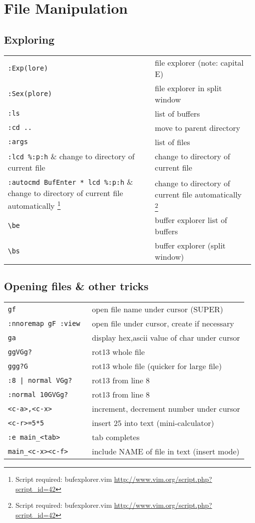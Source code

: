 \section{File Manipulation}

\subsection{Exploring}
\begin{center}
\begin{longtable}{l|l}
 \verb!:Exp(lore)! & file explorer (note: capital E)\\
 \verb!:Sex(plore)! & file explorer in split window\\
 \verb!:ls! & list of buffers\\
 \verb!:cd ..! & move to parent directory\\
 \verb!:args! & list of files\\
 \verb!:lcd %:p:h! & change to directory of current file\\
 \verb!:autocmd BufEnter * lcd %:p:h! & change to directory of current file automatically \footnote{Script required: bufexplorer.vim \url{http://www.vim.org/script.php?script\_id=42}}\\
 \verb!\be! & buffer explorer list of buffers\\
 \verb!\bs! & buffer explorer (split window)
\end{longtable}
\end{center}

\subsection{Opening files \& other tricks}
\begin{center}
\begin{longtable}{l|l}
 \verb!gf! & open file name under cursor (SUPER)\\
 \verb!:nnoremap gF :view ! & open file under cursor, create if necessary\\
 \verb!ga! & display hex,ascii value of char under cursor\\
 \verb!ggVGg?! & rot13 whole file\\
 \verb!ggg?G! & rot13 whole file (quicker for large file)\\
 \verb!:8 | normal VGg?! & rot13 from line 8\\
 \verb!:normal 10GVGg?! & rot13 from line 8\\
 \verb!<c-a>,<c-x>! & increment, decrement number under cursor\\
 \verb!<c-r>=5*5! & insert 25 into text (mini-calculator)\\
 \verb!:e main_<tab>! & tab completes\\
 \verb!main_<c-x><c-f>! & include NAME of file in text (insert mode)
\end{longtable}
\end{center}

